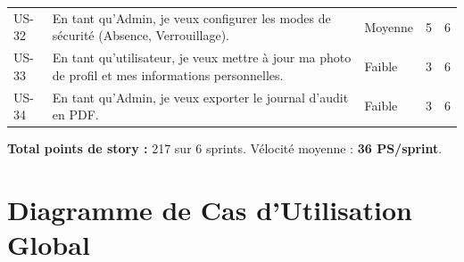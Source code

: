 \begin{center}
\begin{longtable}{p{} p{} p{} p{} p{}}
US-32 & En tant qu'Admin, je veux configurer les modes de sécurité (Absence, Verrouillage). & Moyenne & 5 & 6 \\
US-33 & En tant qu'utilisateur, je veux mettre à jour ma photo de profil et mes informations personnelles. & Faible & 3 & 6 \\
US-34 & En tant qu'Admin, je veux exporter le journal d'audit en PDF. & Faible & 3 & 6 \\
\end{longtable}
\end{center}

\vspace{0.3cm}
\noindent\textbf{Total points de story :} 217 sur 6 sprints. Vélocité moyenne : \textbf{36 PS/sprint}.

\section{Diagramme de Cas d'Utilisation Global}

